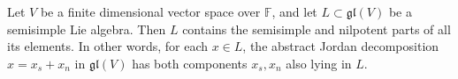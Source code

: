 Let $V$ be a finite dimensional vector space over $\mathbb{F}$, and let $L \subset \mathfrak{gl}(V)$ be a semisimple Lie algebra. Then $L$ contains the semisimple and nilpotent parts of all its elements. In other words, for each $x \in L$, the abstract Jordan decomposition $x = x_s + x_n$ in $\mathfrak{gl}(V)$ has both components $x_s, x_n$ also lying in $L$.
